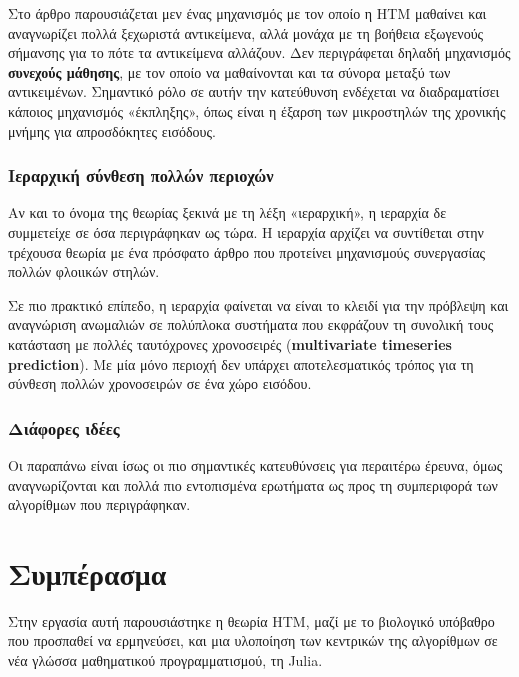 	Στο άρθρο \cite{hawkinsTheoryHowColumns2017} παρουσιάζεται μεν ένας μηχανισμός με τον οποίο η HTM μαθαίνει και αναγνωρίζει πολλά ξεχωριστά αντικείμενα,
	αλλά μονάχα με τη βοήθεια εξωγενούς σήμανσης για το πότε τα αντικείμενα αλλάζουν.
	Δεν περιγράφεται δηλαδή μηχανισμός \textbf{συνεχούς μάθησης}, με τον οποίο να μαθαίνονται και τα σύνορα μεταξύ των αντικειμένων.
	Σημαντικό ρόλο σε αυτήν την κατεύθυνση ενδέχεται να διαδραματίσει κάποιος μηχανισμός «έκπληξης», όπως είναι η έξαρση των μικροστηλών της χρονικής μνήμης
	για απροσδόκητες εισόδους.

\subsubsection{Ιεραρχική σύνθεση πολλών περιοχών}

	Αν και το όνομα της θεωρίας ξεκινά με τη λέξη «ιεραρχική», η ιεραρχία δε συμμετείχε σε όσα περιγράφηκαν ως τώρα.
	Η ιεραρχία αρχίζει να συντίθεται στην τρέχουσα θεωρία με ένα πρόσφατο άρθρο \cite{hawkinsFrameworkIntelligenceCortical2019}
	που προτείνει μηχανισμούς συνεργασίας πολλών φλοιικών στηλών.

	Σε πιο πρακτικό επίπεδο, η ιεραρχία φαίνεται να είναι το κλειδί για την πρόβλεψη και αναγνώριση ανωμαλιών σε πολύπλοκα συστήματα
	που εκφράζουν τη συνολική τους κατάσταση με πολλές ταυτόχρονες χρονοσειρές (\textbf{multivariate timeseries prediction}).
	Με μία μόνο περιοχή δεν υπάρχει αποτελεσματικός τρόπος για τη σύνθεση πολλών χρονοσειρών σε ένα χώρο εισόδου.

\subsubsection{Διάφορες ιδέες}

	Οι παραπάνω είναι ίσως οι πιο σημαντικές κατευθύνσεις για περαιτέρω έρευνα, όμως αναγνωρίζονται και πολλά πιο εντοπισμένα ερωτήματα
	ως προς τη συμπεριφορά των αλγορίθμων που περιγράφηκαν.
	





\section{Συμπέρασμα}

	Στην εργασία αυτή παρουσιάστηκε η θεωρία HTM, μαζί με το βιολογικό υπόβαθρο που προσπαθεί να ερμηνεύσει,
	και μια υλοποίηση των κεντρικών της αλγορίθμων σε νέα γλώσσα μαθηματικού προγραμματισμού, τη Julia.

